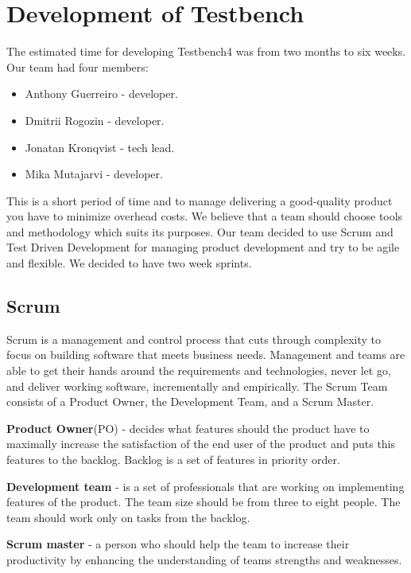 \chapter{Development of Testbench}
\label{ch:testbenchdevelop}
  
  The estimated time for developing Testbench4 was from two months to six weeks.
  Our team had four members:
  \begin{itemize}
    \item Anthony Guerreiro - developer.
    \item Dmitrii Rogozin - developer.
    \item Jonatan Kronqvist - tech lead.
    \item Mika Mutajarvi - developer.
    
  \end{itemize}
  
   This is a short period of time and to manage delivering a good-quality product you
    have to minimize overhead costs. We believe that a team should choose tools
    and methodology which suits its purposes. 
    Our team decided to use Scrum and Test Driven Development for managing
    product development and try to be agile and flexible. 
    We decided to have two week sprints.

  \section{Scrum}
    Scrum is a management and control process that cuts through
    complexity to focus on building software that meets business needs. Management and teams are able to get their
    hands around the requirements and technologies, never let go, and deliver working software,
    incrementally and empirically. The Scrum Team consists of a Product Owner,
    the Development Team, and a Scrum Master.
    
  \textbf{Product Owner}(PO) - decides what features should the product have to
  maximally increase the satisfaction of the end user of the product and puts this features to the backlog.
  Backlog is a set of features in priority order.
  
  \textbf{Development team} - is
  a set of professionals that are working on implementing features of the product. 
  The team size should be from three to eight people. The team should work only on tasks from the backlog.
  
  \textbf{Scrum master} - a person who should help the team to increase their
  productivity by enhancing the understanding of teams strengths and weaknesses.

